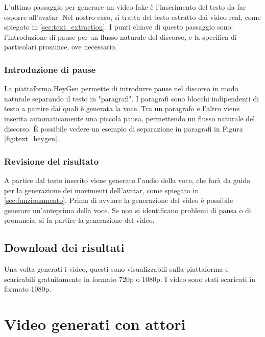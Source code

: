 L'ultimo passaggio per generare un video fake è l'inserimento del testo da far esporre all'avatar. Nel nostro caso, si tratta del testo estratto dai video real, come spiegato in \ref{sec:text_extraction}. 
I punti chiave di questo passaggio sono: l'introduzione di pause per un flusso naturale del discorso, e la specifica di particolari pronunce, ove necessario.

\subsubsection{Introduzione di pause}
    
La piattaforma HeyGen permette di introdurre pause nel discorso in modo naturale separando il testo in "paragrafi". I paragrafi sono blocchi indipendenti di testo a partire dai quali è generata la voce. Tra un paragrafo e l'altro viene inserita automaticamente una piccola pausa, permettendo un flusso naturale del discorso. È possibile vedere un esempio di separazione in paragrafi in Figura \ref{fig:text_heygen}.

\subsubsection{Revisione del risultato}

A partire dal testo inserito viene generato l'audio della voce, che farà da guida per la generazione dei movimenti dell'avatar, come spiegato in \ref{sec:funzionamento}. Prima di avviare la generazione del video è possibile generare un'anteprima della voce. Se non si identificano problemi di pausa o di pronuncia, si fa partire la generazione del video.

\subsection{Download dei risultati}

Una volta generati i video, questi sono visualizzabili sulla piattaforma e scaricabili gratuitamente in formato 720p o 1080p. I video sono stati scaricati in formato 1080p.

\section{Video generati con attori}


\clearpage
